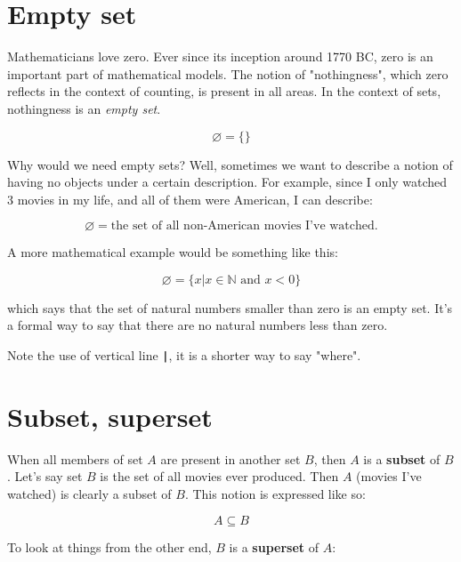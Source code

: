 \documentclass[12pt, a4paper, justified, notitlepage, sfsidenotes, notoc]{book}
\begin{document}
\section{Empty set}
\label{sec:org216fd5a}

Mathematicians love zero. Ever since its inception around 1770 BC, zero is an important part of mathematical models. The notion of "nothingness", which zero reflects in the context of counting, is present in all areas. In the context of sets, nothingness is an \emph{empty set}.

\begin{equation}
\varnothing = \{\}
\end{equation}

Why would we need empty sets? Well, sometimes we want to describe a notion of having no objects under a certain description. For example, since I only watched 3 movies in my life, and all of them were American, I can describe:

\begin{equation}
\varnothing = \textrm{the set of all non-American movies I've watched}.
\end{equation}

A more mathematical example would be something like this:

\begin{equation}
\varnothing = \{x | x \in \mathbb{N} \textrm{ and } x < 0\}
\end{equation}

which says that the set of natural numbers smaller than zero is an empty set. It's a formal way to say that there are no natural numbers less than zero.

Note the use of vertical line \textbf{\texttt{|}}, it is a shorter way to say "where".

\section{Subset, superset}
\label{sec:org1e2a9b1}

When all members of set \(A\) are present in another set \(B\), then \(A\) is a \textbf{subset} of \(B\). Let's say set \(B\) is the set of all movies ever produced. Then \(A\) (movies I've watched) is clearly a subset of \(B\). This notion is expressed like so:

\begin{equation}
A \subseteq B
\end{equation}

To look at things from the other end, \(B\) is a \textbf{superset} of \(A\):
\end{document}

